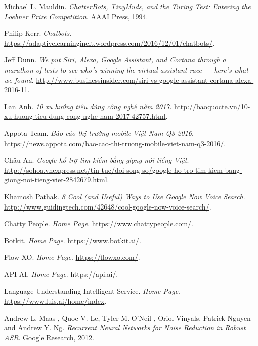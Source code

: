 \documentclass[12pt]{report}
\begin{document}
\begin{flushleft}
\begin{thebibliography}{9}

Michael L. Mauldin.
\textit{ChatterBots, TinyMuds, and the Turing Test: Entering the Loebner Prize Competition}.
AAAI Press, 1994.

Philip Kerr. 
\textit{Chatbots}.
\url{https://adaptivelearninginelt.wordpress.com/2016/12/01/chatbots/}.

Jeff Dunn. 
\textit{We put Siri, Alexa, Google Assistant, and Cortana through a marathon of tests to see who's winning the virtual assistant race — here's what we found}.
\url{http://www.businessinsider.com/siri-vs-google-assistant-cortana-alexa-2016-11}.

Lan Anh. 
\textit{10 xu hướng tiêu dùng công nghệ năm 2017}.
\url{http://baoquocte.vn/10-xu-huong-tieu-dung-cong-nghe-nam-2017-42757.html}.

Appota Team. 
\textit{Báo cáo thị trường mobile Việt Nam Q3-2016}.
\url{https://news.appota.com/bao-cao-thi-truong-mobile-viet-nam-q3-2016/}.

Châu An. 
\textit{Google hỗ trợ tìm kiếm bằng giọng nói tiếng Việt}. 
\url{http://sohoa.vnexpress.net/tin-tuc/doi-song-so/google-ho-tro-tim-kiem-bang-giong-noi-tieng-viet-2842679.html}.

Khamosh Pathak. 
\textit{8 Cool (and Useful) Ways to Use Google Now Voice Search}.
\url{http://www.guidingtech.com/42648/cool-google-now-voice-search/}.

Chatty People. 
\textit{Home Page}.
\url{https://www.chattypeople.com/}.

Botkit. 
\textit{Home Page}.
\url{https://www.botkit.ai/}.

Flow XO. 
\textit{Home Page}.
\url{https://flowxo.com/}.

API AI. 
\textit{Home Page}.
\url{https://api.ai/}.

Language Understanding Intelligent Service. 
\textit{Home Page}.
\url{https://www.luis.ai/home/index}.

Andrew L. Maas , Quoc V. Le, Tyler M. O’Neil , Oriol Vinyals, Patrick Nguyen and Andrew Y. Ng. 
\textit{Recurrent Neural Networks for Noise Reduction in Robust ASR}. 
Google Research, 2012.


\end{thebibliography}
\end{flushleft}
\end{document}
